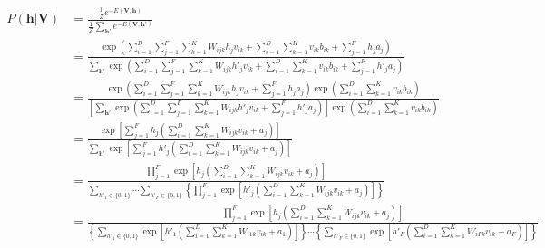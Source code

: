 \begin{align}
    P(\mathbf{h} | \mathbf{V}) &= \frac{\frac{1}{Z} e^{-E(\mathbf{V}, \mathbf{h})}}{\frac{1}{Z} \sum\limits_{\mathbf{h}'} e^{-E(\mathbf{V}, \mathbf{h}')}} \\ %
    &= \frac{ \exp{ \left( \sum\limits^{D}_{i=1} \sum\limits^{F}_{j=1} \sum\limits^{K}_{k=1} W_{ijk} h_{j} v_{ik} + \sum\limits^{D}_{i=1} \sum\limits^{K}_{k=1} v_{ik} b_{ik} + \sum\limits^{F}_{j=1} h_{j} a_{j} \right)}}{ \sum\limits_{\mathbf{h}'} \exp{ \left( \sum\limits^{D}_{i=1} \sum\limits^{F}_{j=1} \sum\limits^{K}_{k=1} W_{ijk} h'_{j} v_{ik} + \sum\limits^{D}_{i=1} \sum\limits^{K}_{k=1} v_{ik} b_{ik} + \sum\limits^{F}_{j=1} h'_{j} a_{j}\right)}} \nonumber \\ %
    &= \frac{ \exp{ \left( \sum\limits^{D}_{i=1} \sum\limits^{F}_{j=1} \sum\limits^{K}_{k=1} W_{ijk} h_{j} v_{ik} + \sum\limits^{F}_{j=1} h_{j} a_{j}\right) \exp{ \left( \sum\limits^{D}_{i=1} \sum\limits^{K}_{k=1} v_{ik} b_{ik}\right)}}}{ \left[ \sum\limits_{\mathbf{h}'} \exp{ \left( \sum\limits^{D}_{i=1} \sum\limits^{F}_{j=1} \sum\limits^{K}_{k=1} W_{ijk} h'_{j} v_{ik} + \sum\limits^{F}_{j=1} h'_{j} a_{j}\right)}\right] \exp{ \left( \sum\limits^{D}_{i=1} \sum\limits^{K}_{k=1} v_{ik} b_{ik}\right)}} \nonumber \\ %
    &= \frac{ \exp{ \left[ \sum\limits^{F}_{j=1} h_{j} \left( \sum\limits^{D}_{i=1} \sum\limits^{K}_{k=1} W_{ijk} v_{ik} + a_{j}\right)\right]}}{ \sum\limits_{\mathbf{h}'} \exp{ \left[ \sum\limits^{F}_{j=1} h'_{j} \left( \sum\limits^{D}_{i=1} \sum\limits^{K}_{k=1} W_{ijk} v_{ik} + a_{j}\right)\right]}} \nonumber \\ %
    &= \frac{ \prod\limits^{F}_{j=1} \exp{ \left[h_{j} \left( \sum\limits^{D}_{i=1} \sum\limits^{K}_{k=1} W_{ijk} v_{ik} + a_{j}\right)\right]}}{\sum\limits_{h'_{1} \in \{0,1\}} \cdots \sum\limits_{h'_{F} \in \{0,1\}} \left\{ \prod\limits^{F}_{j=1} \exp{ \left[h'_{j} \left( \sum\limits^{D}_{i=1} \sum\limits^{K}_{k=1} W_{ijk} v_{ik} + a_{j}\right)\right]}\right\}} \nonumber \\ %
    &= \frac{ \prod\limits^{F}_{j=1} \exp{ \left[h_{j} \left(\sum\limits^{D}_{i=1} \sum\limits^{K}_{k=1} W_{ijk} v_{ik} + a_{j}\right)\right]}}{ \left\{ \sum\limits_{h'_{1} \in \{0,1\}} \exp{ \left[h'_{1} \left( \sum\limits^{D}_{i=1} \sum\limits^{K}_{k=1} W_{i1k} v_{ik} + a_{1}\right)\right]}\right\} \cdots \left\{ \sum\limits_{h'_{F} \in \{0,1\}} \exp{ \left[h'_{F} \left( \sum\limits^{D}_{i=1} \sum\limits^{K}_{k=1} W_{iFk} v_{ik} + a_{F}\right)\right]}\right\}}  \nonumber
\end{align}

%




